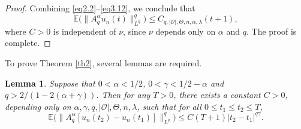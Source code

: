 \documentclass[10pt]{article}
\numberwithin{figure}{section}
\numberwithin{equation}{section}
\newtheorem{lemma}[theorem]{Lemma}
\newtheorem{remark}[theorem]{Remark}
\newcommand{\0}{{\theta}}
\def\br{\begin{remark}}
\def\er{\end{remark}}
\def\gam{\gamma}
\def\a{\alpha}
\begin{document}
\begin{proof}
Combining \eqref{eq2.2}--\eqref{eq3.12}, we conclude that
$$
\mathbb{E}\big(\|A_q^\alpha u_n(t)\|_{L^q}^q\big) \le C_{q,|\mathcal O|,\Theta,n,\alpha,\lambda}(t+1),
$$
where $C>0$ is independent of $\nu$, since $\nu$ depends only on $\alpha$ and $q$. The proof is complete.
\end{proof}
\vs
To prove Theorem \ref{th2}, several lemmas are required. 


\begin{lemma}\label{lem:Jn-estimate}
Suppose that $0<\a<1/2$, $0<\gam<1/2-\alpha$ and
$q>2/(1-2(\alpha+\gamma))$.
Then for any $T>0$, there exists a constant $C>0$, depending only on $\alpha,\gamma,q,|\mathcal O|,\Theta,n,\lambda$, such that for all $0\le t_1\le t_2\le T$,
\begin{equation}\label{eq2.6}
\mathbb{E}\big(\|A_q^\alpha [u_n(t_2)-u_n(t_1)]\|_{L^q}^q\big)
\le C(T+1)|t_2-t_1|^{q\gamma}.
\end{equation}
\end{lemma}
\end{document}
